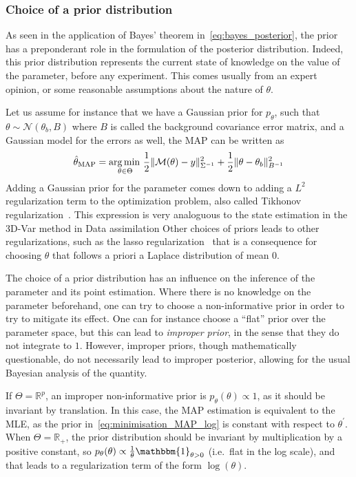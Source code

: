 \documentclass[../../Main_ManuscritThese.tex]{subfiles}
\begin{document}
\subsubsection{Choice of a prior distribution}
\label{sec:choice_prior}
As seen in the application of Bayes' theorem in~\cref{eq:bayes_posterior}, the prior has a preponderant role in the formulation of the posterior distribution. Indeed, this prior distribution represents the current state of knowledge on the value of the parameter, before any experiment. This comes usually from an expert opinion, or some reasonable assumptions about the nature of $\theta$.

Let us assume for instance that we have a Gaussian prior for $p_\theta$, such that $\theta \sim \mathcal{N}(\theta_{b},B)$ where $B$ is called the background covariance error matrix, and a Gaussian model for the errors as well, the MAP can be written as
\begin{equation}
  \hat{\theta}_{\mathrm{MAP}} = \operatorname*{arg\,min \,}_{\theta \in \Theta} \frac{1}{2}\| \mathcal{M}(\theta) - y\|^2_{\Sigma^{-1}} + \frac{1}{2}\|\theta - \theta_b\|^2_{B^{-1}}
\end{equation}
Adding a Gaussian prior for the parameter comes down to adding a $L^2$ regularization term to the optimization problem, also called Tikhonov regularization~\cite{tikhonov_solutions_1977}. This expression is very analoguous to the state estimation in the 3D-Var method in Data assimilation 
Other choices of priors leads to other regularizations, such as the lasso regularization~\cite{tibshirani_regression_2011} that is a consequence for choosing $\theta$ that follows a priori a Laplace distribution of mean $0$.


The choice of a prior distribution has an influence on the inference of the parameter and its point estimation. Where there is no knowledge on the parameter beforehand, one can try to choose a non-informative prior in order to try to mitigate its effect. One can for instance choose a ``flat'' prior over the parameter space, but this can lead to \emph{improper prior}, in the sense that they do not integrate to $1$. However, improper priors, though mathematically questionable, do not necessarily lead to improper posterior, allowing for the usual Bayesian analysis of the quantity.

If $\Theta = \mathbb{R}^p$, an improper non-informative prior is $p_{\theta}(\theta) \propto 1$, as it should be invariant by translation. In this case, the MAP estimation is equivalent to the MLE, as the prior in~\cref{eq:minimisation_MAP_log} is constant with respect to $\theta^{\prime}$.
When $\Theta = \mathbb{R}_+$, the prior distribution should be invariant by multiplication by a positive constant, so $p_{\theta}(\theta) \propto \frac{1}{\theta}\mathbbm{1}_{\theta > 0}$ (i.e.\ flat in the log scale), and that leads to a regularization term of the form $\log(\theta)$.
\end{document}
